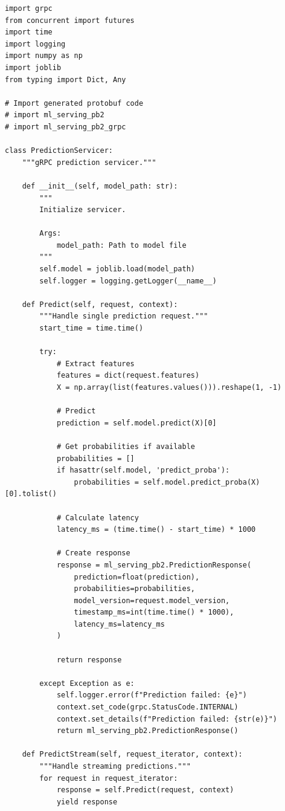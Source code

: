\begin{lstlisting}[style=python, caption={gRPC Server Implementation}]
import grpc
from concurrent import futures
import time
import logging
import numpy as np
import joblib
from typing import Dict, Any

# Import generated protobuf code
# import ml_serving_pb2
# import ml_serving_pb2_grpc

class PredictionServicer:
    """gRPC prediction servicer."""

    def __init__(self, model_path: str):
        """
        Initialize servicer.

        Args:
            model_path: Path to model file
        """
        self.model = joblib.load(model_path)
        self.logger = logging.getLogger(__name__)

    def Predict(self, request, context):
        """Handle single prediction request."""
        start_time = time.time()

        try:
            # Extract features
            features = dict(request.features)
            X = np.array(list(features.values())).reshape(1, -1)

            # Predict
            prediction = self.model.predict(X)[0]

            # Get probabilities if available
            probabilities = []
            if hasattr(self.model, 'predict_proba'):
                probabilities = self.model.predict_proba(X)[0].tolist()

            # Calculate latency
            latency_ms = (time.time() - start_time) * 1000

            # Create response
            response = ml_serving_pb2.PredictionResponse(
                prediction=float(prediction),
                probabilities=probabilities,
                model_version=request.model_version,
                timestamp_ms=int(time.time() * 1000),
                latency_ms=latency_ms
            )

            return response

        except Exception as e:
            self.logger.error(f"Prediction failed: {e}")
            context.set_code(grpc.StatusCode.INTERNAL)
            context.set_details(f"Prediction failed: {str(e)}")
            return ml_serving_pb2.PredictionResponse()

    def PredictStream(self, request_iterator, context):
        """Handle streaming predictions."""
        for request in request_iterator:
            response = self.Predict(request, context)
            yield response


\end{lstlisting}
